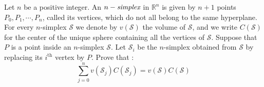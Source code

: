 Let $n$ be a positive integer. An $n-\emph{simplex}$ in $\mathbb{R}^n$ is given by $n+1$ points $P_0, P_1,\cdots  , P_n$, called its vertices, which do not all belong to the same hyperplane. For every $n$-simplex $\mathcal{S}$ we denote by $v(\mathcal{S})$ the volume of $\mathcal{S}$, and we write $C(\mathcal{S})$ for the center of the unique sphere containing all the vertices of $\mathcal{S}$.
Suppose that $P$ is a point inside an $n$-simplex $\mathcal{S}$. Let $\mathcal{S}_i$ be the $n$-simplex obtained from $\mathcal{S}$ by replacing its $i^{\text{th}}$ vertex by $P$. Prove that :
\[ \sum_{j=0}^{n}v(\mathcal{S}_j)C(\mathcal{S}_j)=v(\mathcal{S})C(\mathcal{S}) \]